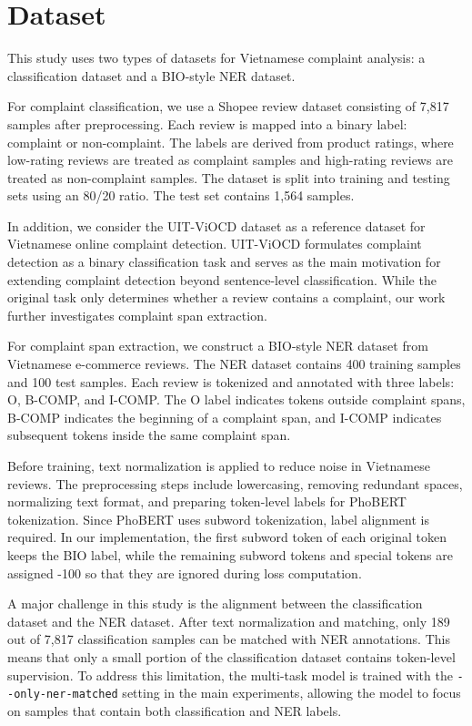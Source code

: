 \documentclass[11pt]{article}
\begin{document}
\section{Dataset}

This study uses two types of datasets for Vietnamese complaint analysis: a classification dataset and a BIO-style NER dataset.

For complaint classification, we use a Shopee review dataset consisting of 7,817 samples after preprocessing. Each review is mapped into a binary label: complaint or non-complaint. The labels are derived from product ratings, where low-rating reviews are treated as complaint samples and high-rating reviews are treated as non-complaint samples. The dataset is split into training and testing sets using an 80/20 ratio. The test set contains 1,564 samples.

In addition, we consider the UIT-ViOCD dataset as a reference dataset for Vietnamese online complaint detection. UIT-ViOCD formulates complaint detection as a binary classification task and serves as the main motivation for extending complaint detection beyond sentence-level classification. While the original task only determines whether a review contains a complaint, our work further investigates complaint span extraction.

For complaint span extraction, we construct a BIO-style NER dataset from Vietnamese e-commerce reviews. The NER dataset contains 400 training samples and 100 test samples. Each review is tokenized and annotated with three labels: O, B-COMP, and I-COMP. The O label indicates tokens outside complaint spans, B-COMP indicates the beginning of a complaint span, and I-COMP indicates subsequent tokens inside the same complaint span.

Before training, text normalization is applied to reduce noise in Vietnamese reviews. The preprocessing steps include lowercasing, removing redundant spaces, normalizing text format, and preparing token-level labels for PhoBERT tokenization. Since PhoBERT uses subword tokenization, label alignment is required. In our implementation, the first subword token of each original token keeps the BIO label, while the remaining subword tokens and special tokens are assigned -100 so that they are ignored during loss computation.

A major challenge in this study is the alignment between the classification dataset and the NER dataset. After text normalization and matching, only 189 out of 7,817 classification samples can be matched with NER annotations. This means that only a small portion of the classification dataset contains token-level supervision. To address this limitation, the multi-task model is trained with the \verb|--only-ner-matched| setting in the main experiments, allowing the model to focus on samples that contain both classification and NER labels.
\end{document}
